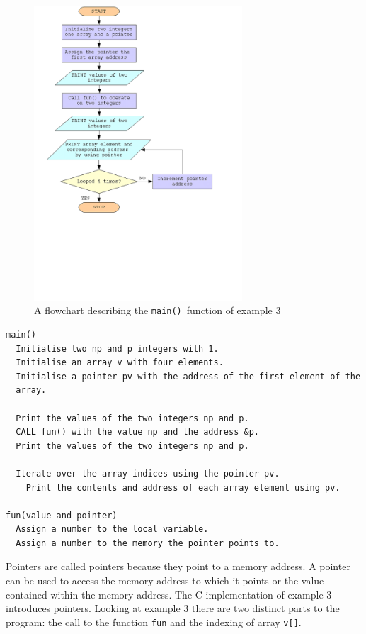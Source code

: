 \documentclass[11pt]{scrartcl}
\def\main{\texttt{main()}}
\begin{document}
\begin{figure}[h]
\begin{center}
\includegraphics[height=11cm]{figures/ex3}
\caption{A flowchart describing the \main\ function of example 3
\label{figure:flowchart_ex3}}
\end{center}
\end{figure}

\begin{pseudocode}[h]
\begin{verbatim}
main()
  Initialise two np and p integers with 1.
  Initialise an array v with four elements.
  Initialise a pointer pv with the address of the first element of the
  array. 

  Print the values of the two integers np and p.
  CALL fun() with the value np and the address &p.
  Print the values of the two integers np and p.

  Iterate over the array indices using the pointer pv.
    Print the contents and address of each array element using pv.

fun(value and pointer)
  Assign a number to the local variable.
  Assign a number to the memory the pointer points to.
\end{verbatim}
\caption{Example 3 in pseudocode \label{pseudo:ex3}}
\end{pseudocode}

Pointers are called pointers because they point to a memory address.
A pointer can be used to access the memory address to which it points
or the value contained within the memory address.  The C
implementation of example 3 introduces pointers.  Looking at example 3
there are two distinct parts to the program: the call to the function
\texttt{fun} and the indexing of array \texttt{v[]}.
\end{document}

